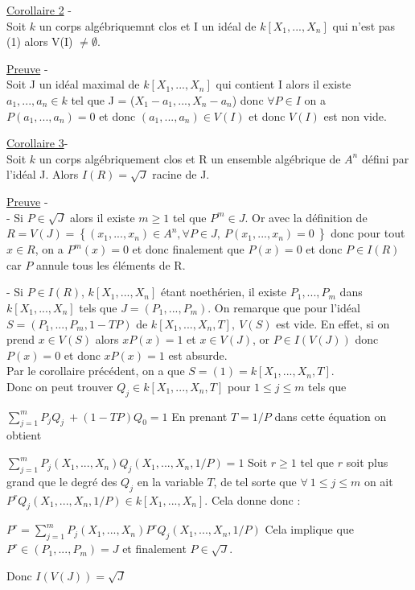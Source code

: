 \documentclass[a4paper,10pt]{article}
\begin{document}
\underline{Corollaire 2} - \\
Soit $k$ un corps algébriquemnt clos et I un idéal de $k[X_{1},...,X_{n}] $  qui n'est pas (1) alors V(I) $\neq \emptyset$.

\underline{Preuve} - \\
Soit J un idéal maximal de $k[X_{1},...,X_{n}] $ qui contient I alors il existe $a_{1},..., a_{n} \in  k $ tel que J = ($X_{1} - a_{1}, ... ,  X_{n} - a_{n}$) donc $\forall P \in I$ on a $P(a_{1},..., a_{n}) = 0$ et donc $(a_{1},..., a_{n}) \in V(I) $ et donc $V(I)$ est non vide.

\underline{Corollaire 3}- \\
Soit $k$ un corps algébriquement clos et R un ensemble algébrique de $A^{n}$ défini par l'idéal J. Alors $I(R) = \sqrt{J}$ racine de J.

\underline{Preuve} -\\
- Si $ P \in \sqrt{J} $ alors il existe $m \geq 1$ tel que $ P ^{m} \in J$. Or avec la définition de $R =V(J) = \left\{  (x_{1}, ... , x_{n}) \in A^{n} , \forall P \in J , \ P(x_{1}, ... , x_{n}) = 0 \ \right\}$ donc pour tout $x \in R$, on a $P^{m}(x) = 0$ et donc finalement que $P(x) = 0$ et donc $P \in I(R)$ car $P$ annule tous les éléments de R.

- Si $P \in I(R)$, $k[X_{1},...,X_{n}] $ étant noethérien, il existe $P_{1},..., P_{m} $ dans $k[X_{1},...,X_{n}] $ tels que $J = (P_{1},..., P_{m})$. On remarque que pour l'idéal $ S = (P_{1},..., P_{m},1-TP) $ de $k[X_{1},...,X_{n},T]  ,\ V(S) $ est vide. En effet, si on prend $x \in V(S)$ alors $xP(x) = 1$ et $x \in V(J)$, or $P \in I(V(J))$ donc $P(x) = 0$ et donc $xP(x) = 1$ est absurde.\\ Par le corollaire précédent, on a que $S = (1) =k[X_{1},...,X_{n},T]$. \\
Donc on peut trouver $Q_{j} \in k[X_{1},...,X_{n},T]$ pour $1 \le j \le m$ tels que 

\centering 
$\sum_{j = 1}^m P_{j}Q_{j} \ + (1- TP)Q_{0} = 1$
\flushleft En prenant $T= 1/P$ dans cette équation on obtient

\centering $\sum_{j = 1}^m P_{j}(X_{1},...,X_{n})Q_{j}(X_{1},...,X_{n},1/P)  = 1$
\flushleft Soit $ r\geq 1$ tel que $r$ soit plus grand que le degré des $Q_{j}$ en la variable $T$, de tel sorte que $ \forall \ 1 \le j \le m$ on ait $P^{r} Q_{j}(X_{1},...,X_{n},1/P) \in k[X_{1},...,X_{n}]$. Cela donne donc :

\centering $P^{r} = \sum_{j = 1}^m P_{j}(X_{1},...,X_{n})P^{r}Q_{j}(X_{1},...,X_{n},1/P) $ 
\flushleft Cela implique que $P^{r} \in (P_{1},..., P_{m}) = J$ et finalement $P \in \sqrt{J}$.

Donc $I(V(J)) = \sqrt{J}$
\end{document}
